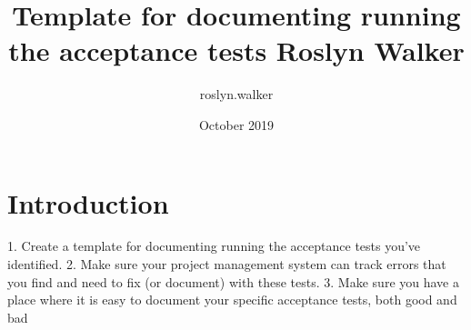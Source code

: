 \documentclass{article}
\title{Template for documenting running the acceptance tests Roslyn Walker}
\author{roslyn.walker }
\date{October 2019}
\begin{document}
\maketitle

\section{Introduction}
1. Create a template for documenting running the acceptance tests you’ve identified. 
2. Make sure your project management system can track errors that you find and need to fix (or document) with these tests.
3. Make sure you have a place where it is easy to document your specific acceptance tests, both good and bad
\end{document}
